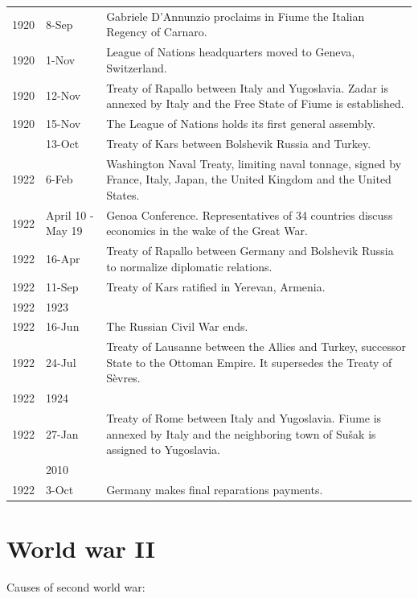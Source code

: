 \documentclass[
  openany]{book}
\begin{document}
\begin{longtable}[t]{rl>{\raggedright\arraybackslash}p{22em}}
1920 & 8-Sep & Gabriele D'Annunzio proclaims in Fiume the Italian Regency of Carnaro.\\
\rowcolor{gray!6}  1920 & 1-Nov & League of Nations headquarters moved to Geneva, Switzerland.\\
1920 & 12-Nov & Treaty of Rapallo between Italy and Yugoslavia. Zadar is annexed by Italy and the Free State of Fiume is established.\\
\rowcolor{gray!6}  1920 & 15-Nov & The League of Nations holds its first general assembly.\\
\addlinespace
1921 & 13-Oct & Treaty of Kars between Bolshevik Russia and Turkey.\\
\rowcolor{gray!6}  1922 & 6-Feb & Washington Naval Treaty, limiting naval tonnage, signed by France, Italy, Japan, the United Kingdom and the United States.\\
1922 & April 10 - May 19 & Genoa Conference. Representatives of 34 countries discuss economics in the wake of the Great War.\\
\rowcolor{gray!6}  1922 & 16-Apr & Treaty of Rapallo between Germany and Bolshevik Russia to normalize diplomatic relations.\\
1922 & 11-Sep & Treaty of Kars ratified in Yerevan, Armenia.\\
\addlinespace
\rowcolor{gray!6}  1922 & 1923 & 1923\\
1922 & 16-Jun & The Russian Civil War ends.\\
\rowcolor{gray!6}  1922 & 24-Jul & Treaty of Lausanne between the Allies and Turkey, successor State to the Ottoman Empire. It supersedes the Treaty of Sèvres.\\
1922 & 1924 & 1924\\
\rowcolor{gray!6}  1922 & 27-Jan & Treaty of Rome between Italy and Yugoslavia. Fiume is annexed by Italy and the neighboring town of Sušak is assigned to Yugoslavia.\\
\addlinespace
1922 & 2010 & 2010\\
\rowcolor{gray!6}  1922 & 3-Oct & Germany makes final reparations payments.\\
\bottomrule
\end{longtable}

\hypertarget{world-war-ii}{%
\section{World war II}\label{world-war-ii}}

Causes of second world war:
\end{document}
